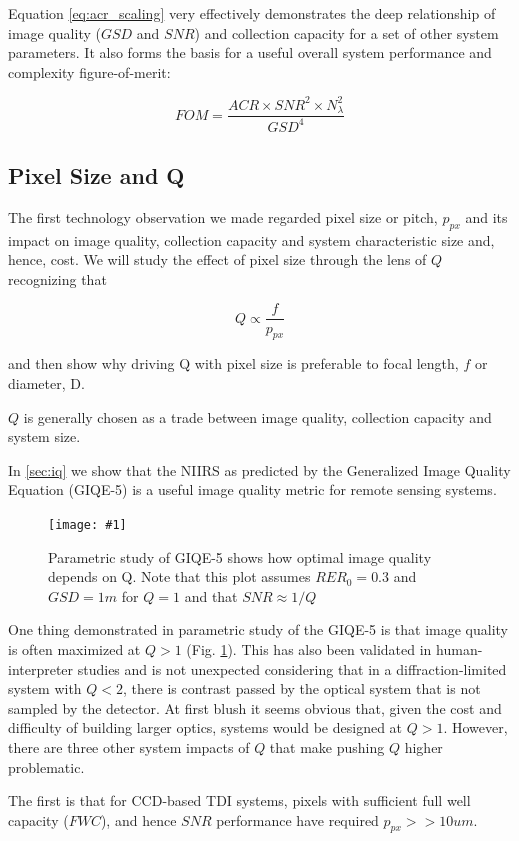 \documentclass[10pt,journal]{IEEEtran}  %
\newcommand{\includefigure}[3]
{
  \begin{figure}[h!]
  \centering
  \texttt{[image: \#1]}
  \caption[]{#3}
  \label{#2}
  \end{figure}
}
\begin{document}
Equation \ref{eq:acr_scaling} very effectively demonstrates the deep relationship of image quality ($GSD$ and $SNR$) and collection capacity for a set of other system parameters.  It also forms the basis for a useful overall system performance and complexity figure-of-merit:

\begin{equation}
    \label{eq:perf_complex_metric}
    FOM = \frac{ACR \times SNR^2 \times N_{\lambda}^2}{GSD^4}
\end{equation}

\subsection{Pixel Size and Q}

The first technology observation we made regarded pixel size or pitch, $p_{px}$ and its impact on image quality, collection capacity and system characteristic size and, hence, cost.  We will study the effect of pixel size through the lens of $Q$ recognizing that

$$Q \propto \frac{f}{p_{px}}$$

and then show why driving Q with pixel size is preferable to focal length, $f$ or diameter, D.

$Q$ is generally chosen as a trade between image quality, collection capacity and system size.  

In \ref{sec:iq} we show that the NIIRS as predicted by the Generalized Image Quality Equation (GIQE-5) is a useful image quality metric for remote sensing systems.

\includefigure{figures/Q_iq.pgf}{fig:q_iq}{Parametric study of GIQE-5 shows how optimal image quality depends on Q.  Note that this plot assumes $RER_0 = 0.3$ and $GSD = 1m$ for $Q=1$ and that $SNR \approx 1 / Q$}

One thing demonstrated in parametric study of the GIQE-5 is that image quality is often maximized at $Q>1$ (Fig. \ref{fig:q_iq}).  This has also been validated in human-interpreter studies \cite{fiete_Q_IQ} and is not unexpected considering that in a diffraction-limited system with $Q<2$, there is contrast passed by the optical system that is not sampled by the detector.  At first blush it seems obvious that, given the cost and difficulty of building larger optics, systems would be designed at $Q>1$.  However, there are three other system impacts of $Q$ that make pushing $Q$ higher problematic.

The first is that for CCD-based TDI systems, pixels with sufficient full well capacity ($FWC$), and hence $SNR$ performance have required $p_{px} >> 10um$.
\end{document}
